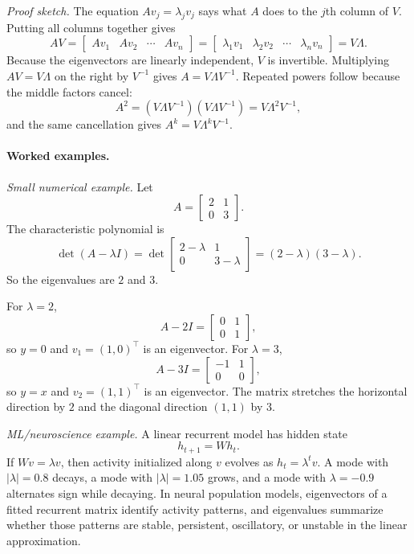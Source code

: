 \emph{Proof sketch.} The equation \(Av_j=\lambda_jv_j\) says what \(A\) does to the \(j\)th column of \(V\). Putting all columns together gives
\[
AV=
\begin{bmatrix}
Av_1&Av_2&\cdots&Av_n
\end{bmatrix}
=
\begin{bmatrix}
\lambda_1v_1&\lambda_2v_2&\cdots&\lambda_nv_n
\end{bmatrix}
=V\Lambda.
\]
Because the eigenvectors are linearly independent, \(V\) is invertible. Multiplying \(AV=V\Lambda\) on the right by \(V^{-1}\) gives \(A=V\Lambda V^{-1}\). Repeated powers follow because the middle factors cancel:
\[
A^2=(V\Lambda V^{-1})(V\Lambda V^{-1})=V\Lambda^2V^{-1},
\]
and the same cancellation gives \(A^k=V\Lambda^kV^{-1}\).

\paragraph{Worked examples.}
\emph{Small numerical example.} Let
\[
A=
\begin{bmatrix}
2&1\\
0&3
\end{bmatrix}.
\]
The characteristic polynomial is
\[
\det(A-\lambda I)
=
\det
\begin{bmatrix}
2-\lambda&1\\
0&3-\lambda
\end{bmatrix}
=(2-\lambda)(3-\lambda).
\]
So the eigenvalues are \(2\) and \(3\).

For \(\lambda=2\),
\[
A-2I=
\begin{bmatrix}
0&1\\
0&1
\end{bmatrix},
\]
so \(y=0\) and \(v_1=(1,0)^\top\) is an eigenvector. For \(\lambda=3\),
\[
A-3I=
\begin{bmatrix}
-1&1\\
0&0
\end{bmatrix},
\]
so \(y=x\) and \(v_2=(1,1)^\top\) is an eigenvector. The matrix stretches the horizontal direction by \(2\) and the diagonal direction \((1,1)\) by \(3\).

\emph{ML/neuroscience example.} A linear recurrent model has hidden state
\[
h_{t+1}=Wh_t.
\]
If \(Wv=\lambda v\), then activity initialized along \(v\) evolves as \(h_t=\lambda^t v\). A mode with \(|\lambda|=0.8\) decays, a mode with \(|\lambda|=1.05\) grows, and a mode with \(\lambda=-0.9\) alternates sign while decaying. In neural population models, eigenvectors of a fitted recurrent matrix identify activity patterns, and eigenvalues summarize whether those patterns are stable, persistent, oscillatory, or unstable in the linear approximation.

